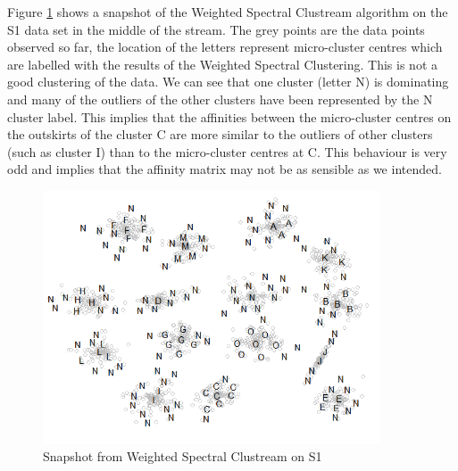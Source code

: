 Figure \ref{fig:weighted_issues} shows a snapshot of the Weighted Spectral Clustream algorithm on the S1 data set in the middle of the stream. The grey points are the data points observed so far, the location of the letters represent micro-cluster centres which are labelled with the results of the Weighted Spectral Clustering. This is not a good clustering of the data.  We can see that one cluster (letter N) is dominating and many of the outliers of the other clusters have been represented by the N cluster label. This implies that the affinities between the micro-cluster centres on the outskirts of the cluster C are more similar to the outliers of other clusters (such as cluster I) than to the micro-cluster centres at C. This behaviour is very odd and implies that the affinity matrix may not be as sensible as we intended.

\begin{figure}[h]
  \centering
  \includegraphics[width = 10cm]{weighted_issues_N_crop}
  \caption{Snapshot from Weighted Spectral Clustream on S1}
\label{fig:weighted_issues}
\end{figure}

